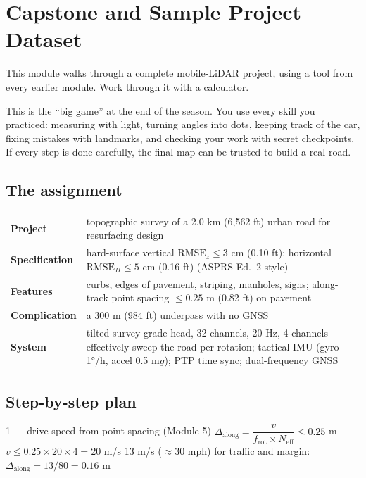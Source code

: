 \chapter{Capstone and Sample Project Dataset}

This module walks through a complete mobile-LiDAR project, using a tool from every earlier module. Work through it with a calculator.

\begin{kid}
This is the ``big game'' at the end of the season. You use every skill you practiced: measuring with light, turning angles into dots, keeping track of the car, fixing mistakes with landmarks, and checking your work with secret checkpoints. If every step is done carefully, the final map can be trusted to build a real road.
\end{kid}

\section{The assignment}
\begin{center}\small
\renewcommand{\arraystretch}{1.2}
\begin{tabularx}{\linewidth}{>{\bfseries}lX}\toprule
Project & topographic survey of a 2.0 km (6,562 ft) urban road for resurfacing design\\
Specification & hard-surface vertical $\text{RMSE}_z\le3$ cm (0.10 ft); horizontal $\text{RMSE}_H\le5$ cm (0.16 ft) (ASPRS Ed.\ 2 style)\\
Features & curbs, edges of pavement, striping, manholes, signs; along-track point spacing $\le0.25$ m (0.82 ft) on pavement\\
Complication & a 300 m (984 ft) underpass with no GNSS\\
System & tilted survey-grade head, 32 channels, 20 Hz, 4 channels effectively sweep the road per rotation; tactical IMU (gyro 1°/h, accel 0.5 m$g$); PTP time sync; dual-frequency GNSS\\\bottomrule
\end{tabularx}\end{center}

\section{Step-by-step plan}
\begin{worked}{1 --- drive speed from point spacing (Module 5)}
 $\Delta_{\text{along}}=\dfrac{v}{f_{\text{rot}}\times N_{\text{eff}}}\le0.25$ m
 $v\le0.25\times20\times4=20$ m/s
 13 m/s ($\approx$30 mph) for traffic and margin: $\Delta_{\text{along}}=13/80=0.16$ m \checkmark
\end{worked}

